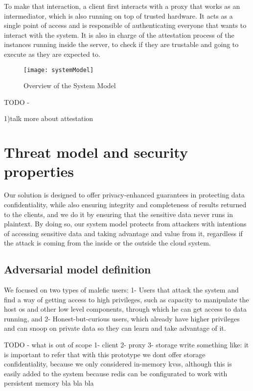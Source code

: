 To make that interaction, a client first interacts with a proxy that works as an intermediator, which is also running on top of trusted hardware. It acts as a single point of access and is responsible of authenticating everyone that wants to interact with the system. It is also in charge of the attestation process of the instances running inside the server, to check if they are trustable and going to execute as they are expected to. 


\begin{figure}[htbp]
	\centering
	{\texttt{[image: systemModel]}}
	\caption{Overview of the System Model}
	\label{fig:systemModel}
\end{figure}

TODO - 

1)talk more about attestation



\section{Threat model and security properties} %
\label{sec:threatModel_and_securityProperties}

Our solution is designed to offer privacy-enhanced guarantees in protecting data confidentiality, while also ensuring integrity and completeness of results returned to the clients, and we do it by ensuring that the sensitive data never runs in plaintext. By doing so, our system model protects from attackers with intentions of accessing sensitive data and taking advantage and value from it, regardless if the attack is coming from the inside or the outside the cloud system.


\subsection{Adversarial model definition}

We focused on two types of malefic users: 1- Users that attack the system and find a way of getting access to high privileges, such as capacity to manipulate the host \gls{os} and other low level components, through which he can get access to data running, and 2-  Honest-but-curious users, which already have higher privileges and can snoop on private data so they can learn and take advantage of it.

TODO - what is out of scope
1- client
2- proxy
3- storage
write something like: it is important to refer that with this prototype we dont offer storage confidentiality, because we only considered in-memory \gls{kvs}s, although this is easily added to the system because redis can be configurated to work with persistent memory bla bla bla

